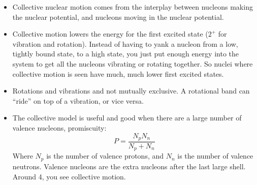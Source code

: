 \documentclass[letter]{article}
\begin{document}
\begin{itemize}
\item Collective nuclear motion comes from the interplay between
  nucleons making the nuclear potential, and nucleons moving in the
  nuclear potential.~\cite[Lec. 13-16]{lecture}
\item Collective motion lowers the energy for the first excited state
  ($2^+$ for vibration and rotation). Instead of having to yank
  a nucleon from a low, tightly bound state, to a high state, you just
  put enough energy into the system to get all the nucleons vibrating
  or rotating together. So nuclei where collective motion is seen have
  much, much lower first excited states.
\item Rotations and vibrations and not mutually
  exclusive. A rotational band can ``ride'' on top of a vibration, or
  vice versa.
\item The collective model is useful and good when there are a large
  number of valence nucleons, promiscuity:
  \begin{equation*}
    P=\frac{N_pN_n}{N_p+N_n}
  \end{equation*}
Where $N_p$ is the number of valence protons, and $N_n$ is the number
of valence neutrons. Valence nucleons are the extra nucleons after the
last large shell. Around 4, you see collective motion.~\cite[Lec. 13-16]{lecture}
\end{itemize}
\end{document}
